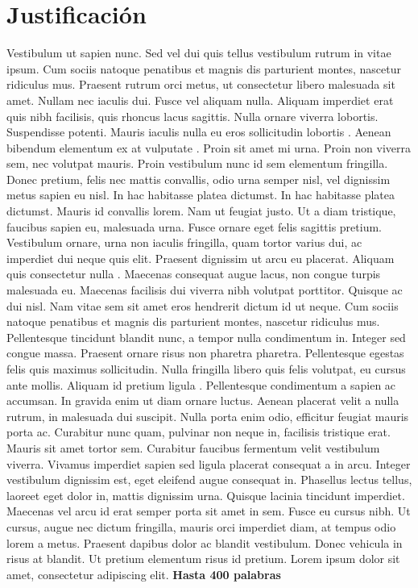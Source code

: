 \section{Justificación}
%
Vestibulum ut sapien nunc. Sed vel dui quis tellus vestibulum rutrum in vitae ipsum. Cum sociis natoque penatibus et magnis dis parturient montes, nascetur ridiculus mus. Praesent rutrum orci metus, ut consectetur libero malesuada sit amet. Nullam nec iaculis dui. Fusce vel aliquam nulla. Aliquam imperdiet erat quis nibh facilisis, quis rhoncus lacus sagittis. Nulla ornare viverra lobortis. Suspendisse potenti. Mauris iaculis nulla eu eros sollicitudin lobortis \cite{Gates:1985bt}. 
Aenean bibendum elementum ex at vulputate \cite{Gates:1985gk}. Proin sit amet mi urna. Proin non viverra sem, nec volutpat mauris. Proin vestibulum nunc id sem elementum fringilla. Donec pretium, felis nec mattis convallis, odio urna semper nisl, vel dignissim metus sapien eu nisl. In hac habitasse platea dictumst. In hac habitasse platea dictumst. Mauris id convallis lorem. Nam ut feugiat justo. Ut a diam tristique, faucibus sapien eu, malesuada urna. Fusce ornare eget felis sagittis pretium. Vestibulum ornare, urna non iaculis fringilla, quam tortor varius dui, ac imperdiet dui neque quis elit. Praesent dignissim ut arcu eu placerat. Aliquam quis consectetur nulla \cite{book:1351506}.
Maecenas consequat augue lacus, non congue turpis malesuada eu. Maecenas facilisis dui viverra nibh volutpat porttitor. Quisque ac dui nisl. Nam vitae sem sit amet eros hendrerit dictum id ut neque. Cum sociis natoque penatibus et magnis dis parturient montes, nascetur ridiculus mus. Pellentesque tincidunt blandit nunc, a tempor nulla condimentum in. Integer sed congue massa. Praesent ornare risus non pharetra pharetra. Pellentesque egestas felis quis maximus sollicitudin. Nulla fringilla libero quis felis volutpat, eu cursus ante mollis. Aliquam id pretium ligula \cite{book:1351506}.
Pellentesque condimentum a sapien ac accumsan. In gravida enim ut diam ornare luctus. Aenean placerat velit a nulla rutrum, in malesuada dui suscipit. Nulla porta enim odio, efficitur feugiat mauris porta ac. Curabitur nunc quam, pulvinar non neque in, facilisis tristique erat. Mauris sit amet tortor sem. Curabitur faucibus fermentum velit vestibulum viverra. Vivamus imperdiet sapien sed ligula placerat consequat a in arcu. Integer vestibulum dignissim est, eget eleifend augue consequat in. Phasellus lectus tellus, laoreet eget dolor in, mattis dignissim urna. Quisque lacinia tincidunt imperdiet. Maecenas vel arcu id erat semper porta sit amet in sem. Fusce eu cursus nibh.
Ut cursus, augue nec dictum fringilla, mauris orci imperdiet diam, at tempus odio lorem a metus. Praesent dapibus dolor ac blandit vestibulum. Donec vehicula in risus at blandit. Ut pretium elementum risus id pretium. Lorem ipsum dolor sit amet, consectetur adipiscing elit. {\bf \Large Hasta 400 palabras}